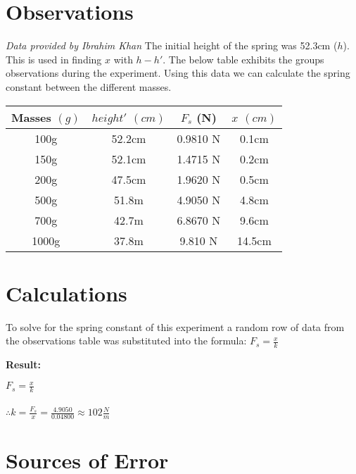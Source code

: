 \documentclass{article}
\begin{document}
\section*{Observations}
\textit{Data provided by Ibrahim Khan}\newline
The initial height of the spring was 52.3cm ($h$). This is used in finding $x$ with $h - h\prime$.
The below table exhibits the groups observations during the experiment. Using this data we can calculate the spring constant between the different masses.\newline\newline
\begin{tabular}{ |c|c|c|c| } \hline
    Masses $(g)$ & $height\prime$ $(cm)$ & $F_{s}$ (N) & $x$ $(cm)$ \\ \hline
    100g         & 52.2cm                & 0.9810 N    & 0.1cm      \\ \hline
    150g         & 52.1cm                & 1.4715 N    & 0.2cm      \\ \hline
    200g         & 47.5cm                & 1.9620 N    & 0.5cm      \\ \hline
    500g         & 51.8m                 & 4.9050 N    & 4.8cm      \\ \hline
    700g         & 42.7m                 & 6.8670 N    & 9.6cm      \\ \hline
    1000g        & 37.8m                 & 9.810 N     & 14.5cm     \\ \hline
\end{tabular}\newline\newline
\section*{Calculations}
\noindent To solve for the spring constant of this experiment a random row of data from the observations table was substituted into the formula: $F_{s} = \frac{x}{k}$
\newline

\noindent\textbf{Result:} \\
\begin{adjustwidth}{0.5cm}{0pt}
    $F_{s} = \frac{x}{k}$ \\\\
    $\therefore k = \frac{F_{s}}{x} = \frac{4.9050}{0.04800} \approx 102\frac{N}{m}$
\end{adjustwidth}

\section*{Sources of Error}
\end{document}
